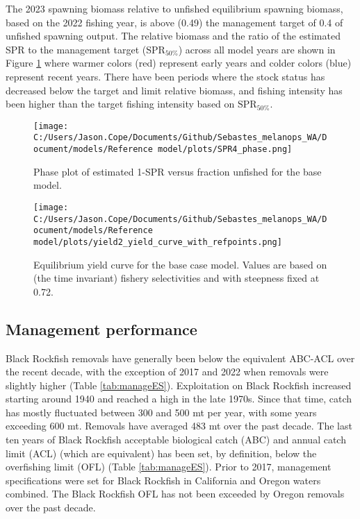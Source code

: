 \documentclass[11pt,
  english,
  letterpaper,
]{article}
\begin{document}
The 2023 spawning biomass relative to unfished equilibrium spawning biomass, based on the 2022 fishing year, is above (0.49) the management target of 0.4 of unfished spawning output. The relative biomass and the ratio of the estimated SPR to the management target (\(\text{SPR}_{50\%}\)) across all model years are shown in Figure \ref{fig:es-phase} where warmer colors (red) represent early years and colder colors (blue) represent recent years. There have been periods where the stock status has decreased below the target and limit relative biomass, and fishing intensity has been higher than the target fishing intensity based on \(\text{SPR}_{50\%}\).

\begin{figure}
\centering
\texttt{[image: C:/Users/Jason.Cope/Documents/Github/Sebastes\_melanops\_WA/Document/models/Reference model/plots/SPR4\_phase.png]}
\caption{Phase plot of estimated 1-SPR versus fraction unfished for the base model.\label{fig:es-phase}}
\end{figure}

\begin{figure}
\centering
\texttt{[image: C:/Users/Jason.Cope/Documents/Github/Sebastes\_melanops\_WA/Document/models/Reference model/plots/yield2\_yield\_curve\_with\_refpoints.png]}
\caption{Equilibrium yield curve for the base case model. Values are based on (the time invariant) fishery selectivities and with steepness fixed at 0.72.\label{fig:es-yield}}
\end{figure}



\clearpage

\hypertarget{management-performance}{%
\subsection*{Management performance}\label{management-performance}}

Black Rockfish removals have generally been below the equivalent ABC-ACL over the recent decade, with the exception of 2017 and 2022 when removals were slightly higher (Table \ref{tab:manageES}). Exploitation on Black Rockfish increased starting around 1940 and reached a high in the late 1970s. Since that time, catch has mostly fluctuated between 300 and 500 mt per year, with some years exceeding 600 mt. Removals have averaged 483 mt over the past decade. The last ten years of Black Rockfish acceptable biological catch (ABC) and annual catch limit (ACL) (which are equivalent) has been set, by definition, below the overfishing limit (OFL) (Table \ref{tab:manageES}). Prior to 2017, management specifications were set for Black Rockfish in California and Oregon waters combined. The Black Rockfish OFL has not been exceeded by Oregon removals over the past decade.
\end{document}
